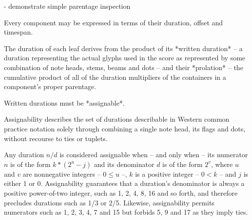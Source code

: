 \begin{markdown}
-   demonstrate simple parentage inspection

Every component may be expressed in terms of their duration, offset and
timespan.

The duration of each leaf derives from the product of its *written duration*
-- a duration representing the actual glyphs used in the score as represented
by some combination of note heads, stems, beams and dots -- and their
*prolation* -- the cumulative product of all of the duration multipliers of the
containers in a component's proper parentage.

Written durations must be *assignable*.

Assignability describes the set of durations describable in Western common
practice notation solely through combining a single note head, its flags and
dots, without recourse to ties or tuplets.

\end{markdown}

Any duration $n/d$ is considered assignable when -- and only when -- its
numerator $n$ is of the form $k * (2^u - j)$ and its denominator $d$ is of the
form $2^v$, where $u$ and $v$ are nonnegative integers -- $0 \leq u$ --, $k$ is
a positive integer -- $0 < k$ -- and $j$ is either 1 or 0. Assignability
guarantees that a duration's denominator is always a positive power-of-two
integer, such as 1, 2, 4, 8, 16 and so forth, and therefore precludes durations
such as 1/3 or 2/5. Likewise, assignability permits numerators such as 1, 2, 3,
4, 7 and 15 but forbids 5, 9 and 17 as they imply ties.

